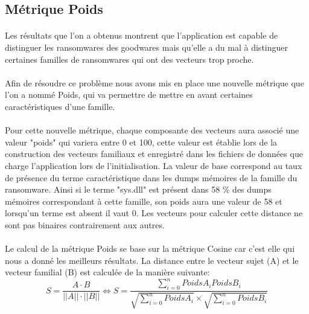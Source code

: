 \documentclass[a4paper, 12pt]{book}
\begin{document}
\subsection{Métrique Poids}
\paragraph{}
Les résultats que l'on a obtenus montrent que l'application est capable de distinguer les ransomwares des goodwares mais qu'elle a du mal à distinguer certaines familles de ransomwares qui ont des vecteurs trop proche.
\paragraph{}
Afin de résoudre ce problème nous avons mis en place une nouvelle métrique que l'on a nommé Poids, qui va permettre de mettre en avant certaines caractéristiques d'une famille.
\paragraph{}
Pour cette nouvelle métrique, chaque composante des vecteurs aura associé une valeur "poids" qui variera entre 0 et 100, cette valeur est établie lors de la construction des vecteurs familiaux et enregistré dans les fichiers de données que charge l'application lors de l'initialisation.
La valeur de base correspond au taux de présence du terme caractéristique dans les dumps mémoires de la famille du ransomware. Ainsi si le terme "sys.dll" est présent dans 58 \% des dumps mémoires correspondant à cette famille, son poids aura une valeur de 58 et lorsqu'un terme est absent il vaut 0. Les vecteurs pour calculer cette distance ne sont pas binaires contrairement aux autres.
\paragraph{}
Le calcul de la métrique Poids se base sur la métrique Cosine car c'est elle qui nous a donné les meilleurs résultats. La distance entre le vecteur sujet (A) et le vecteur familial (B) est calculée de la manière suivante:
\[
    S = \frac{A \cdot B}{||A|| \cdot ||B||}
    \Leftrightarrow S = \frac{\sum_{i=0}^n PoidsA_{i}PoidsB_{i}}{\sqrt{\sum_{i=0}^n PoidsA_{i}}\times\sqrt{\sum_{i=0}^n PoidsB_{i}}}
\]\\
\end{document}
